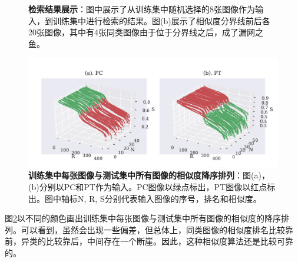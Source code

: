 \begin{figure}[H]
{\begin{minipage}[b]{0.18\textwidth}
		\end{minipage}
		\label{fig:exam-input}
	}
	\caption{\textbf{检索结果展示}：图中展示了从训练集中随机选择的8张图像作为输入，到训练集中进行检索的结果。图(b)展示了相似度分界线前后各20张图像，其中有4张同类图像由于位于分界线之后，成了漏网之鱼。}
	\label{fig:example}
\end{figure}

\begin{figure}[H]
	\centering
	\includegraphics[width=\linewidth]{../figures/retrieval/onebyone.pdf}
	\caption{\textbf{训练集中每张图像与测试集中所有图像的相似度降序排列}：图(a)，(b)分别以PC和PT作为输入。PC图像以绿点标出，PT图像以红点标出。图中轴标N, R, S分别代表输入图像的序号，排名和相似度。}
	\label{fig:r-onebyone}
\end{figure}

图\ref{fig:r-onebyone}以不同的颜色画出训练集中每张图像与测试集中所有图像的相似度的降序排列。可以看到，虽然会出现一些偏差，但总体上，同类图像的相似度排名比较靠前，异类的比较靠后，中间存在一个断崖。因此，这种相似度算法还是比较可靠的。


